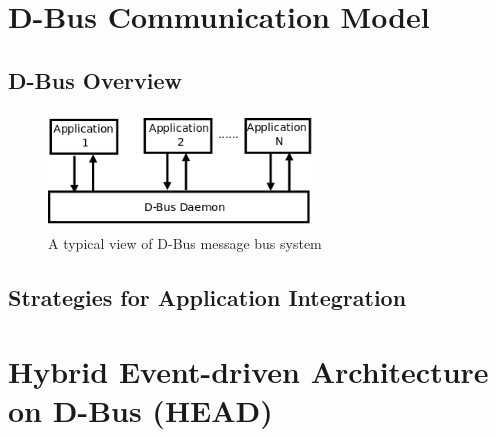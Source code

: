 \documentclass{ifacconf}
\begin{document}
\section{D-Bus Communication Model}
\subsection{D-Bus Overview}
\begin{figure}
\begin{center}
\includegraphics[width=7cm,height=3.1cm]{./dia-files/dbus-daemon}    %
\caption{A typical view of D-Bus message bus system } 
\label{fig:abstract-arch}
\end{center}
\end{figure}


\subsection{Strategies for Application Integration}

\section{Hybrid Event-driven Architecture on D-Bus (HEAD)}
\end{document}
